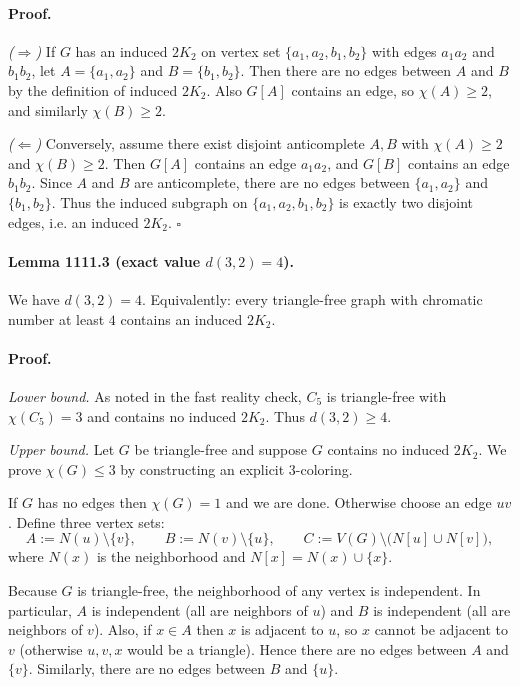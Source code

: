 \paragraph{Proof.}
\emph{($\Rightarrow$)} If $G$ has an induced $2K_2$ on vertex set $\{a_1,a_2,b_1,b_2\}$ with edges $a_1a_2$ and $b_1b_2$, let $A=\{a_1,a_2\}$ and $B=\{b_1,b_2\}$.
Then there are no edges between $A$ and $B$ by the definition of induced $2K_2$.
Also $G[A]$ contains an edge, so $\chi(A)\ge 2$, and similarly $\chi(B)\ge 2$.

\emph{($\Leftarrow$)} Conversely, assume there exist disjoint anticomplete $A,B$ with $\chi(A)\ge 2$ and $\chi(B)\ge 2$.
Then $G[A]$ contains an edge $a_1a_2$, and $G[B]$ contains an edge $b_1b_2$.
Since $A$ and $B$ are anticomplete, there are no edges between $\{a_1,a_2\}$ and $\{b_1,b_2\}$.
Thus the induced subgraph on $\{a_1,a_2,b_1,b_2\}$ is exactly two disjoint edges, i.e. an induced $2K_2$.
\hfill $\square$

\paragraph{Lemma 1111.3 (exact value $d(3,2)=4$).}
We have $d(3,2)=4$.
Equivalently: every triangle-free graph with chromatic number at least $4$ contains an induced $2K_2$.

\paragraph{Proof.}
\emph{Lower bound.}
As noted in the fast reality check, $C_5$ is triangle-free with $\chi(C_5)=3$ and contains no induced $2K_2$.
Thus $d(3,2)\ge 4$.

\emph{Upper bound.}
Let $G$ be triangle-free and suppose $G$ contains no induced $2K_2$.
We prove $\chi(G)\le 3$ by constructing an explicit 3-coloring.

If $G$ has no edges then $\chi(G)=1$ and we are done. Otherwise choose an edge $uv$.
Define three vertex sets:
\[A:=N(u)\setminus\{v\},\qquad B:=N(v)\setminus\{u\},\qquad C:=V(G)\setminus\bigl(N[u]\cup N[v]\bigr),\]
where $N(x)$ is the neighborhood and $N[x]=N(x)\cup\{x\}$.

Because $G$ is triangle-free, the neighborhood of any vertex is independent. In particular, $A$ is independent (all are neighbors of $u$) and $B$ is independent (all are neighbors of $v$).
Also, if $x\in A$ then $x$ is adjacent to $u$, so $x$ cannot be adjacent to $v$ (otherwise $u,v,x$ would be a triangle). Hence there are no edges between $A$ and $\{v\}$.
Similarly, there are no edges between $B$ and $\{u\}$.

